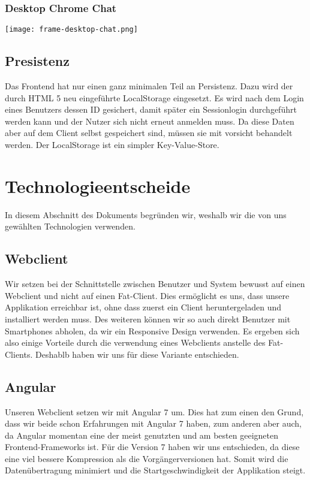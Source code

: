 	\subsubsection{Desktop Chrome Chat}
	\texttt{[image: frame-desktop-chat.png]}

	\subsection{Presistenz}
	Das Frontend hat nur einen ganz minimalen Teil an Persistenz. Dazu wird der durch HTML 5 neu eingeführte LocalStorage eingesetzt. Es wird nach dem Login eines Benutzers dessen ID gesichert, damit später ein Sessionlogin durchgeführt werden kann und der Nutzer sich nicht erneut anmelden muss. Da diese Daten aber auf dem Client selbst gespeichert sind, müssen sie mit vorsicht behandelt werden. Der LocalStorage ist ein simpler Key-Value-Store.

	\section{Technologieentscheide}
	In diesem Abschnitt des Dokuments begründen wir, weshalb wir die von uns gewählten Technologien verwenden.

	\subsection{Webclient}
	Wir setzen bei der Schnittstelle zwischen Benutzer und System bewusst auf einen Webclient und nicht auf einen Fat-Client. Dies ermöglicht es uns, dass unsere Applikation erreichbar ist, ohne dass zuerst ein Client heruntergeladen und installiert werden muss. Des weiteren können wir so auch direkt Benutzer mit Smartphones abholen, da wir ein Responsive Design verwenden. Es ergeben sich also einige Vorteile durch die verwendung eines Webclients anstelle des Fat-Clients. Deshablb haben wir uns für diese Variante entschieden.

	\subsection{Angular}
	Unseren Webclient setzen wir mit Angular 7 um. Dies hat zum einen den Grund, dass wir beide schon Erfahrungen mit Angular 7 haben, zum anderen aber auch, da Angular momentan eine der meist genutzten und am besten geeigneten Frontend-Frameworks ist. Für die Version 7 haben wir uns entschieden, da diese eine viel bessere Kompression als die Vorgängerversionen hat. Somit wird die Datenübertragung minimiert und die Startgeschwindigkeit der Applikation steigt.

